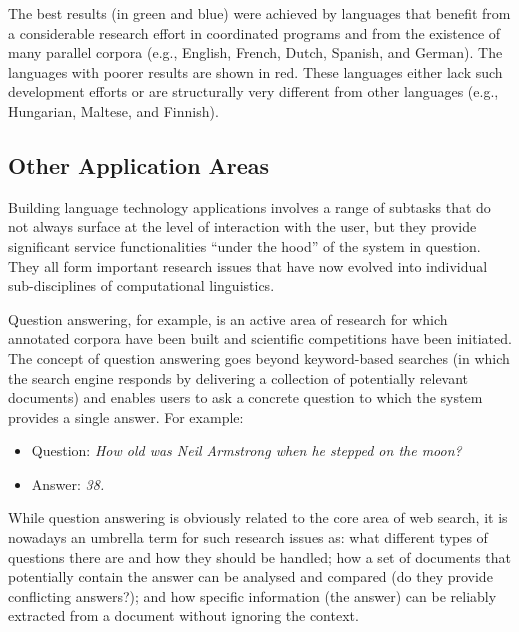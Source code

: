 \begin{multicols}{2}
The best results (in green and blue) were achieved by languages that benefit from a considerable research effort in coordinated programs and from the existence of many parallel corpora (e.g., English, French, Dutch, Spanish, and German).
The languages with poorer results are shown in red.
These languages either lack such development efforts or are structurally very different from other languages (e.g., Hungarian, Maltese, and Finnish).

\subsection{Other Application Areas}
Building language technology applications involves a range of subtasks that do not always surface at the level of interaction with the user, but they provide significant service functionalities ``under the hood'' of the system in question.
They all form important research issues that have now evolved into individual sub-disciplines of computational linguistics. 

Question answering, for example, is an active area of research for which annotated corpora have been built and scientific competitions have been initiated.
The concept of question answering goes beyond keyword-based searches (in which the search engine responds by delivering a collection of potentially relevant documents) and enables users to ask a concrete question to which the system provides a single answer.
For example:
\begin{itemize}
\item[] Question: \textit{How old was Neil Armstrong when he stepped on the moon?}
\item[] Answer: \textit{38.}
\end{itemize}

While question answering is obviously related to the core area of web search, it is nowadays an umbrella term for such research issues as: what different types of questions there are and how they should be handled; how a set of documents that potentially contain the answer can be analysed and compared (do they provide conflicting answers?); and how specific information (the answer) can be reliably extracted from a document without ignoring the context. 


\end{multicols}
